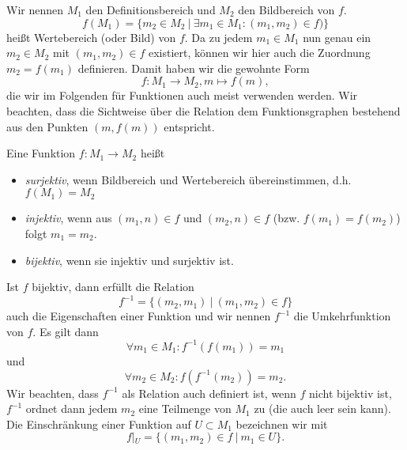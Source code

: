 \documentclass[letterpaper,10pt,english]{jupyterBook}
\begin{document}
Wir nennen \(M_1\) den Definitionsbereich und \(M_2\) den Bildbereich von \(f\).
\begin{equation*}
f(M_1) = \{m_2 \in M_2~|~\exists m_1 \in M_1: (m_1,m_2) \in f)\}
\end{equation*}
heißt Wertebereich (oder Bild) von \(f\).
Da zu jedem \(m_1 \in M_1\) nun genau ein \(m_2 \in M_2\) mit \((m_1,m_2) \in f\) existiert, können wir hier auch die Zuordnung \(m_2=f(m_1)\) definieren. Damit haben wir die gewohnte Form
\begin{equation*}
f: M_1 \rightarrow M_2, m \mapsto f(m),
\end{equation*}
die wir im Folgenden für Funktionen auch meist verwenden werden. Wir beachten, dass die Sichtweise über die Relation dem Funktionsgraphen bestehend aus den Punkten \((m,f(m))\) entspricht.
\label{grundlagen/mengenlogik:definition-11}
\begin{definition}{}{}



Eine Funktion \(f:M_1 \rightarrow M_2\) heißt
\begin{itemize}
\item {} 
\emph{surjektiv}, wenn Bildbereich und Wertebereich übereinstimmen, d.h. \(f(M_1)=M_2\)

\item {} 
\emph{injektiv}, wenn aus \((m_1,n) \in f\) und \((m_2,n) \in f\) (bzw. \(f(m_1) =f(m_2)\)) folgt \(m_1=m_2\).

\item {} 
\emph{bijektiv}, wenn sie injektiv und surjektiv ist.

\end{itemize}
\end{definition}

Ist \(f\) bijektiv, dann erfüllt die Relation
\begin{equation*}
 f^{-1} = \{(m_2,m_1) ~|~ (m_1,m_2) \in f\}
\end{equation*}
auch die Eigenschaften einer Funktion und wir nennen \(f^{-1}\) die Umkehrfunktion von \(f\). Es gilt dann
\begin{equation*}
\forall m_1 \in M_1: f^{-1}(f(m_1))=m_1
\end{equation*}
und
\begin{equation*}
\forall m_2 \in M_2: f(f^{-1}(m_2))=m_2.
\end{equation*}
Wir beachten, dass \(f^{-1}\) als Relation auch definiert ist, wenn \(f\) nicht bijektiv ist, \(f^{-1}\) ordnet dann jedem \(m_2\) eine Teilmenge von \(M_1\) zu (die auch leer sein kann).
Die Einschränkung einer Funktion auf \(U \subset M_1\) bezeichnen wir mit
\begin{equation*}
f|_U = \{ (m_1,m_2) \in f~|~ m_1 \in U\}.
\end{equation*}
\end{document}
